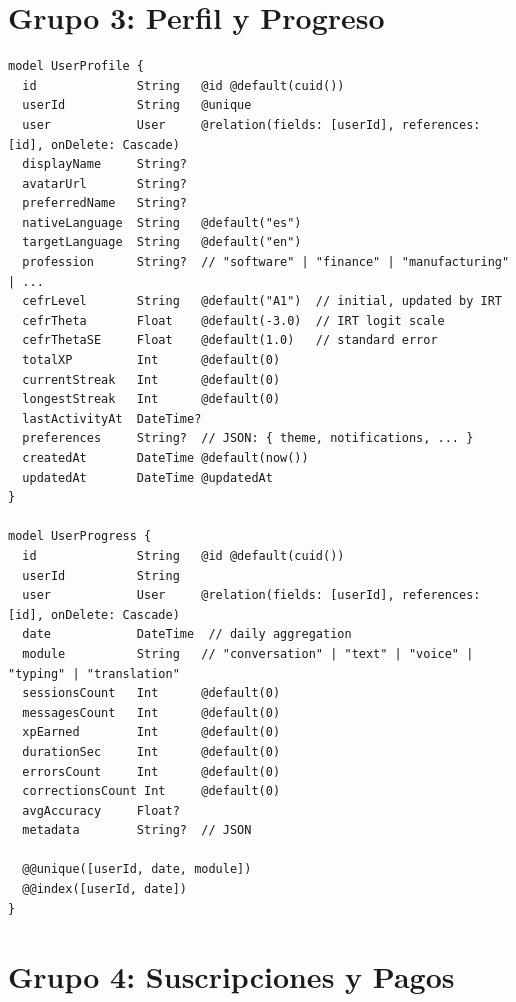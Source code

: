 \section{Grupo 3: Perfil y Progreso}

\begin{lstlisting}[style=sql,caption={Modelos de perfil y progreso del usuario}]
model UserProfile {
  id              String   @id @default(cuid())
  userId          String   @unique
  user            User     @relation(fields: [userId], references: [id], onDelete: Cascade)
  displayName     String?
  avatarUrl       String?
  preferredName   String?
  nativeLanguage  String   @default("es")
  targetLanguage  String   @default("en")
  profession      String?  // "software" | "finance" | "manufacturing" | ...
  cefrLevel       String   @default("A1")  // initial, updated by IRT
  cefrTheta       Float    @default(-3.0)  // IRT logit scale
  cefrThetaSE     Float    @default(1.0)   // standard error
  totalXP         Int      @default(0)
  currentStreak   Int      @default(0)
  longestStreak   Int      @default(0)
  lastActivityAt  DateTime?
  preferences     String?  // JSON: { theme, notifications, ... }
  createdAt       DateTime @default(now())
  updatedAt       DateTime @updatedAt
}

model UserProgress {
  id              String   @id @default(cuid())
  userId          String
  user            User     @relation(fields: [userId], references: [id], onDelete: Cascade)
  date            DateTime  // daily aggregation
  module          String   // "conversation" | "text" | "voice" | "typing" | "translation"
  sessionsCount   Int      @default(0)
  messagesCount   Int      @default(0)
  xpEarned        Int      @default(0)
  durationSec     Int      @default(0)
  errorsCount     Int      @default(0)
  correctionsCount Int     @default(0)
  avgAccuracy     Float?
  metadata        String?  // JSON

  @@unique([userId, date, module])
  @@index([userId, date])
}
\end{lstlisting}

\section{Grupo 4: Suscripciones y Pagos}

